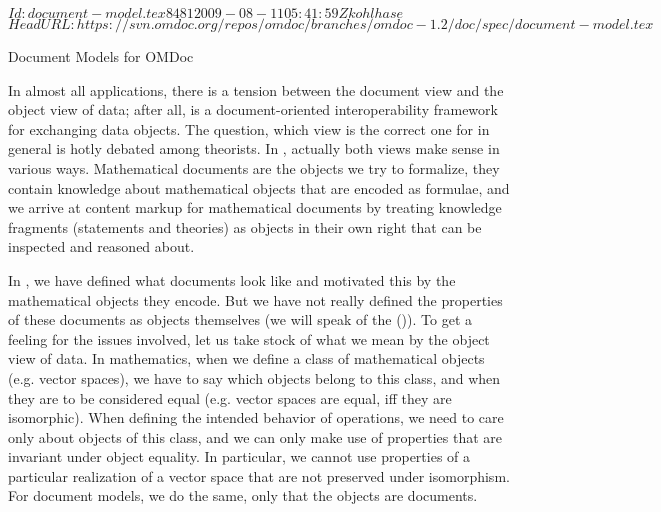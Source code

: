 \svnInfo $Id: document-model.tex 8481 2009-08-11 05:41:59Z kohlhase $
\svnKeyword $HeadURL: https://svn.omdoc.org/repos/omdoc/branches/omdoc-1.2/doc/spec/document-model.tex $

\begin{tchapter}[id=document-model]{Document Models for OMDoc}

  In almost all {\xml} applications, there is a tension between the document view and the
  object view of data; after all, {\xml} is a document-oriented interoperability framework
  for exchanging data objects. The question, which view is the correct one for {\xml} in
  general is hotly debated among {\xml} theorists. In {\omdoc}, actually both views make
  sense in various ways. Mathematical documents are the objects we try to formalize, they
  contain knowledge about mathematical objects that are encoded as formulae, and we arrive
  at content markup for mathematical documents by treating knowledge fragments (statements
  and theories) as objects in their own right that can be inspected and reasoned about.

  In {}, we have defined what {\omdoc} documents look like and
  motivated this by the mathematical objects they encode. But we have not really defined
  the properties of these documents as objects themselves (we will speak of the {\omdoc}
  {} ({})). To get a feeling for the
  issues involved, let us take stock of what we mean by the object view of data. In
  mathematics, when we define a class of mathematical objects (e.g.  vector spaces), we
  have to say which objects belong to this class, and when they are to be considered equal
  (e.g.  vector spaces are equal, iff they are isomorphic). When defining the intended
  behavior of operations, we need to care only about objects of this class, and we can
  only make use of properties that are invariant under object equality. In particular, we
  cannot use properties of a particular realization of a vector space that are not
  preserved under isomorphism. For document models, we do the same, only that the objects
  are documents.



\end{tchapter}
